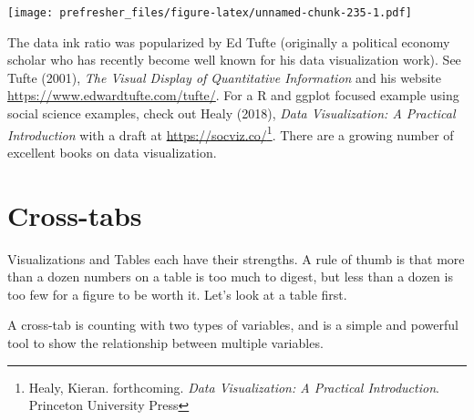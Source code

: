 \documentclass[]{book}
\newenvironment{Shaded}{\begin{snugshade}}{\end{snugshade}}
\newcommand{\KeywordTok}[1]{\textcolor[rgb]{0.13,0.29,0.53}{\textbf{#1}}}
\newcommand{\StringTok}[1]{\textcolor[rgb]{0.31,0.60,0.02}{#1}}
\newcommand{\OperatorTok}[1]{\textcolor[rgb]{0.81,0.36,0.00}{\textbf{#1}}}
\newcommand{\NormalTok}[1]{#1}
\let\rmarkdownfootnote\footnote%
\def\footnote{\protect\rmarkdownfootnote}
\theoremstyle{definition}
\theoremstyle{definition}
\theoremstyle{definition}
\theoremstyle{remark}
\begin{document}
\texttt{[image: prefresher\_files/figure-latex/unnamed-chunk-235-1.pdf]}

The data ink ratio was popularized by Ed Tufte (originally a political
economy scholar who has recently become well known for his data
visualization work). See Tufte (2001), \emph{The Visual Display of
Quantitative Information} and his website
\url{https://www.edwardtufte.com/tufte/}. For a R and ggplot focused
example using social science examples, check out Healy (2018),
\emph{Data Visualization: A Practical Introduction} with a draft at
\url{https://socviz.co/}\footnote{Healy, Kieran. forthcoming. \emph{Data
  Visualization: A Practical Introduction}. Princeton University Press}.
There are a growing number of excellent books on data visualization.

\section{Cross-tabs}\label{cross-tabs}

Visualizations and Tables each have their strengths. A rule of thumb is
that more than a dozen numbers on a table is too much to digest, but
less than a dozen is too few for a figure to be worth it. Let's look at
a table first.

A cross-tab is counting with two types of variables, and is a simple and
powerful tool to show the relationship between multiple variables.

\begin{Shaded}
\end{Shaded}
\end{document}

